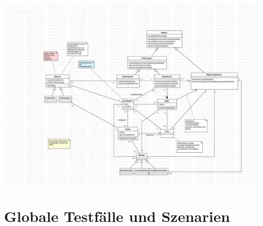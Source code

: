 \documentclass[a4paper,12pt]{article}
\begin{document}
\begin{center}
	\includegraphics[width=\textwidth]{../model.pdf}
\end{center}

\section{Globale Testfälle und Szenarien}

\clearpage

\end{document}
